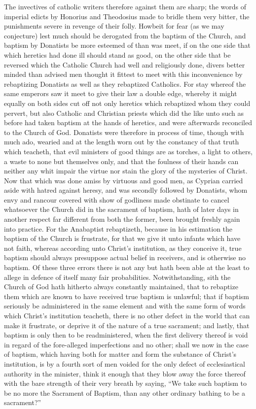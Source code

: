 The invectives of catholic writers therefore against them are sharp; the words of imperial edicts by Honorius and Theodosius made to bridle them very bitter, the punishments  severe in revenge of their folly. Howbeit for fear (as we may conjecture) lest much should be derogated from the baptism of the Church, and baptism by Donatists be more esteemed of than was meet, if on the one side that which heretics had done ill should stand as good, on the other side that be reversed which the Catholic Church had well and religiously done, divers better minded than advised men thought it fittest to meet with this inconvenience by rebaptizing Donatists as well as they rebaptized Catholics. For stay whereof the same emperors saw it meet to give their law a double edge, whereby it might equally on both sides cut off not only heretics which rebaptized whom they could pervert, but also Catholic and Christian priests which did the like unto such as before had taken baptism at the hands of heretics, and were afterwards reconciled to the Church of God. Donatists were therefore in process of time, though with much ado, wearied and at the length worn out by the constancy of that truth which teacheth, that evil ministers of good things are as torches, a light to others, a waste to none but themselves only, and that the foulness of their hands can neither any whit impair the virtue nor stain the glory of the mysteries of Christ.
Now that which was done amiss by virtuous and good men, as Cyprian carried aside with hatred against heresy, and was secondly followed by Donatists, whom envy and rancour covered with show of godliness made obstinate to cancel whatsoever the Church did in the sacrament of baptism, hath of later days in another respect far different from both the former, been brought freshly again into practice. For the Anabaptist rebaptizeth, because in his estimation the baptism of the Church is frustrate, for that we give it unto infants which have not faith, whereas according unto Christ’s institution, as they conceive it, true baptism should always presuppose actual belief in receivers, and is otherwise no baptism.
Of these three errors there is not any but hath been  able at the least to allege in defence of itself many fair probabilities. Notwithstanding, sith the Church of God hath hitherto always constantly maintained, that to rebaptize them which are known to have received true baptism is unlawful; that if baptism seriously be administered in the same element and with the same form of words which Christ’s institution teacheth, there is no other defect in the world that can make it frustrate, or deprive it of the nature of a true sacrament; and lastly, that baptism is only then to be readministered, when the first delivery thereof is void in regard of the fore-alleged imperfections and no other; shall we now in the case of baptism, which having both for matter and form the substance of Christ’s institution, is by a fourth sort of men voided for the only defect of ecclesiastical authority in the minister, think it enough that they blow away the force thereof with the bare strength of their very breath by saying, “We take such baptism to be no more the Sacrament of Baptism, than any other ordinary bathing to be a sacrament?”
